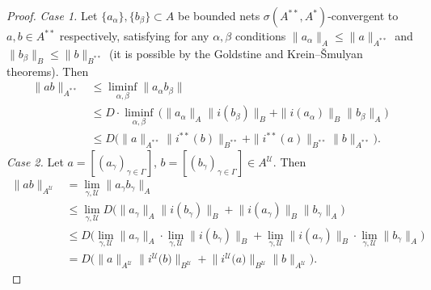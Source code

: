 \documentclass[12pt,fleqn]{amsart}
\theoremstyle{definition}
\numberwithin{equation}{section}
\theoremstyle{remark}
\begin{document}
\begin{proof}\emph{Case 1.} 
    Let $\{a_{\alpha}\}, \{b_{\beta}\} \subset A$ be bounded nets $\sigma(A^{**}, A^*)$-convergent to $a,b \in A^{**}$ respectively, satisfying for any $\alpha, \beta$ conditions $\|a_{\alpha}\|_A \leqslant \|a\|_{A^{**}}$ and $\|b_{\beta}\|_B \leqslant \|b\|_{B^{**}}$ (it is possible by the Goldstine and Krein--\v{S}mulyan theorems). Then
    \begin{equation*}
        \begin{split}
            \|ab\|_{A^{**}} &\leqslant \liminf\limits_{\alpha, \beta} \|a_{\alpha} b_{\beta}\| \\
            &\leqslant D \cdot \liminf\limits_{\alpha, \beta} \, \big(\|a_{\alpha}\|_A\|i(b_{\beta})\|_B+\|i(a_{\alpha})\|_B\|b_{\beta}\|_A\big) \\
            &\leqslant D \big(\|a\|_{A^{**}}\|i^{**}(b)\|_{B^{**}}+\|i^{**}(a)\|_{B^{**}}\|b\|_{A^{**}}\big).
        \end{split}
    \end{equation*}
 \emph{Case 2.} 
    Let $a=[(a_{\gamma})_{\gamma \in \Gamma}]$, $b=[(b_{\gamma})_{\gamma \in \Gamma}] \in A^{\mathscr{U}}.$ Then
    \begin{equation*}
        \begin{split}
            \|a b \|_{A^{{\mathscr{U}}}} &= \lim_{\gamma, \mathscr{U}}\big\|a_{\gamma} b_{\gamma} \big\|_A \\
            &\leqslant \lim_{\gamma, \mathscr{U}} D \Big(\big\|a_{\gamma}\big\|_A\big\|i(b_{\gamma})\big\|_B+\big\|i(a_{\gamma})\big\|_B\big\|b_{\gamma}\big\|_A\Big) \\
            &\leqslant  D \Big( \lim_{\gamma, \mathscr{U}} \big\|a_{\gamma}\big\|_A \cdot \lim_{\gamma, \mathscr{U}}\|i(b_{\gamma})\big\|_B+\lim_{\gamma, \mathscr{U}}\big\|i(a_{\gamma})\big\|_B\cdot \lim_{\gamma, \mathscr{U}}\big\|b_{\gamma}\big\|_A\Big) \\
            &= D \Big(\big\|a\big\|_{A^{{\mathscr{U}}}}\big\|i^{{\mathscr{U}}}\big(b\big)\big\|_{B^{{\mathscr{U}}}}+\big\|i^{{\mathscr{{\mathscr{U}}}}}\big(a\big)\big\|_{B^{{\mathscr{U}}}}\big\|b\big\|_{A^{{\mathscr{U}}}}\Big).
        \end{split}
    \end{equation*} 
%
\end{proof}
\end{document}
